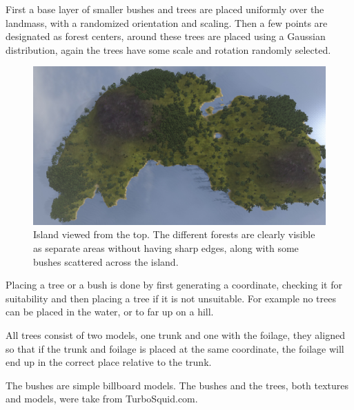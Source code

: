 First a base layer of smaller bushes and trees are placed uniformly over the landmass, with a randomized orientation and scaling. Then a few points are designated as forest centers, around these trees are placed using a Gaussian distribution, again the trees have some scale and rotation randomly selected.
\begin{figure}[H]
  \centering
  \includegraphics[width=0.9\linewidth]{images/forestfromthetop.jpg}
  \caption[Forests]{Island viewed from the top. The different forests are clearly visible as separate areas without having sharp edges, along with some bushes scattered across the island.}
  \label{fig:gaussainForest}
\end{figure}

Placing a tree or a bush is done by first generating a coordinate, checking it for suitability and then placing a tree if it is not unsuitable.
For example no trees can be placed in the water, or to far up on a hill.

All trees consist of two models, one trunk and one with the foilage, they aligned so that if the trunk and foilage is placed at the same coordinate, the foilage will end up in the correct place relative to the trunk.

The bushes are simple billboard models. The bushes and the trees, both textures and models, were take from TurboSquid.com.


